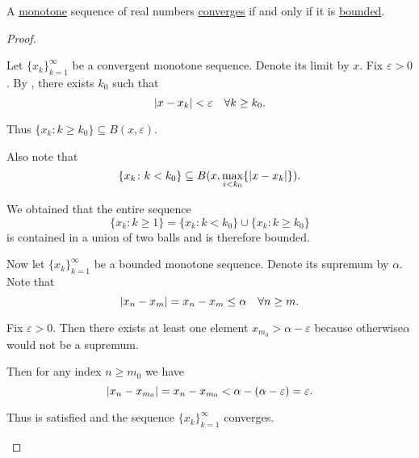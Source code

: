 \begin{proposition}\label{thm:real_monotone_sequence_converges_iff_bounded}
  A \hyperref[def:monotone_map]{monotone} sequence of real numbers \hyperref[def:net_convergence/limit]{converges} if and only if it is \hyperref[def:metric_space/bounded_sequence]{bounded}.
\end{proposition}
\begin{proof}\mbox{}
  \begin{description}
    \Implies Let \( \{ x_k \}_{k=1}^\infty \) be a convergent monotone sequence. Denote its limit by \( x \). Fix \( \varepsilon > 0 \). By , there exists \( k_0 \) such that
    \begin{equation*}
      \left\vert x - x_k \right\vert < \varepsilon \quad\forall k \geq k_0.
    \end{equation*}

    Thus \( \{ x_k \colon k \geq k_0 \} \subseteq B(x, \varepsilon) \).

    Also note that
    \begin{equation*}
      \{ x_k \colon k < k_0 \} \subseteq B(x, \max_{i < k_0} \{ \left\vert x - x_k \right\vert \}).
    \end{equation*}

    We obtained that the entire sequence
    \begin{equation*}
      \{ x_k \colon k \geq 1 \} = \{ x_k \colon k < k_0 \} \cup \{ x_k \colon k \geq k_0 \}
    \end{equation*}
    is contained in a union of two balls and is therefore bounded.

    \ImpliedBy Now let \( \{ x_k \}_{k=1}^\infty \) be a bounded monotone sequence. Denote its supremum by \( \alpha \). Note that
    \begin{equation*}
      \left\vert x_n - x_m \right\vert = x_n - x_m \leq \alpha \quad\forall n \geq m.
    \end{equation*}

    Fix \( \varepsilon > 0 \). Then there exists at least one element \( x_{m_0} > \alpha - \varepsilon \) because otherwise\LEM \( \alpha \) would not be a supremum.

    Then for any index \( n \geq m_0 \) we have
    \begin{equation*}
      \left\vert x_n - x_{m_0} \right\vert = x_n - x_{m_0} < \alpha - (\alpha - \varepsilon) = \varepsilon.
    \end{equation*}

    Thus  is satisfied and the sequence \( \{ x_k \}_{k=1}^\infty \) converges.
  \end{description}
\end{proof}
